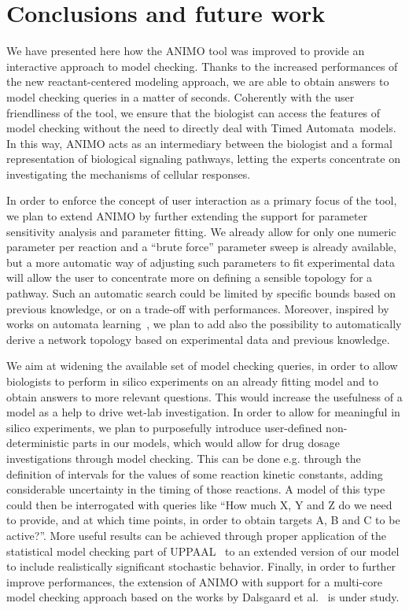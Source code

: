 \documentclass{llncs}
\newcommand{\tas}{Timed Automata}
\begin{document}
\section{Conclusions and future work}\label{sec:conclusion}
We have presented here how the ANIMO tool 
was improved to provide an interactive approach to model checking.
Thanks to the increased performances of the new reactant-centered modeling approach,
we are able to obtain answers to model checking queries in a matter of seconds.
Coherently with the user friendliness of the tool, we ensure that the biologist can access the features
of model checking without the need to directly deal with \tas\ models.
In this way, ANIMO acts as an intermediary between the biologist and a formal
representation of biological signaling pathways, letting the experts concentrate
on investigating the mechanisms of cellular responses.

In order to enforce the concept of user interaction as a primary focus of the tool, we plan to extend
ANIMO by further extending the support for parameter sensitivity analysis and parameter fitting.
We already allow for only one numeric parameter per reaction
and a ``brute force'' parameter sweep is already available, but a more automatic way of adjusting such
parameters to fit experimental data will allow the user to concentrate more on defining a sensible topology for a pathway.
Such an automatic search could be limited by specific bounds based on previous knowledge,
or on a trade-off with performances.
Moreover, inspired by works on automata learning~\cite{test-based-modelling}, we plan to add also the possibility
to automatically derive a network topology based on experimental data and 
previous knowledge.

We aim at widening the available set of model checking queries, in order to allow biologists to perform
in silico experiments on an already fitting model and to obtain answers to more relevant questions.
This would increase the usefulness of a model as a help to drive wet-lab investigation.
In order to allow for meaningful in silico experiments, we plan to purposefully introduce user-defined non-deterministic 
parts in our models, which would allow for drug dosage investigations through model checking.
This can be done e.g. through the definition of intervals for the values of some reaction kinetic constants,
adding considerable uncertainty in the timing of those reactions.
A model of this type could then be interrogated with queries like ``How much X, Y and Z do we need to provide,
and at which time points, in order to obtain targets A, B and C to be active?''.
More useful results can be achieved through proper application of the statistical model checking part of UPPAAL~\cite{uppaal-smc} to
an extended version of our model to include realistically significant stochastic behavior.
Finally, in order to further improve performances, the extension of ANIMO with support for a multi-core model checking approach based on the
works by Dalsgaard et al.~\cite{uppaal-multi-core1}
is under study.





\end{document}

